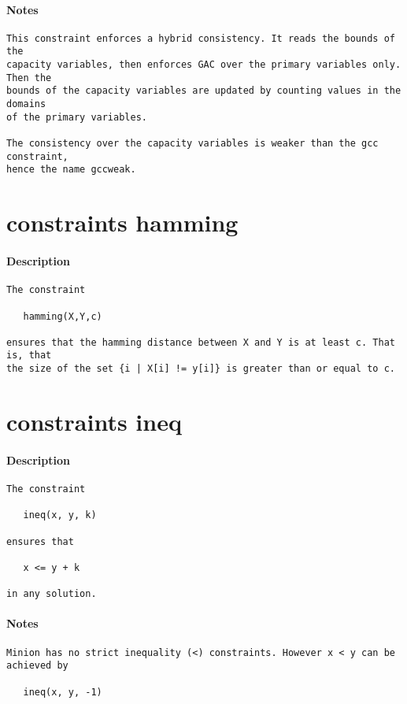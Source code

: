 \paragraph{Notes}
{\footnotesize
\begin{verbatim}
This constraint enforces a hybrid consistency. It reads the bounds of the
capacity variables, then enforces GAC over the primary variables only.  Then the
bounds of the capacity variables are updated by counting values in the domains
of the primary variables.

The consistency over the capacity variables is weaker than the gcc constraint, 
hence the name gccweak.
\end{verbatim}
}
\section{constraints hamming}
\paragraph{Description}
{\footnotesize
\begin{verbatim}
The constraint

   hamming(X,Y,c)

ensures that the hamming distance between X and Y is at least c. That is, that
the size of the set {i | X[i] != y[i]} is greater than or equal to c.
\end{verbatim}
}
\section{constraints ineq}
\paragraph{Description}
{\footnotesize
\begin{verbatim}
The constraint

   ineq(x, y, k)

ensures that 

   x <= y + k 

in any solution.
\end{verbatim}
}
\paragraph{Notes}
{\footnotesize
\begin{verbatim}
Minion has no strict inequality (<) constraints. However x < y can be
achieved by

   ineq(x, y, -1)
\end{verbatim}
}
